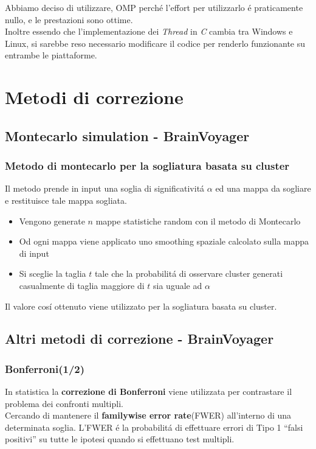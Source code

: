 \documentclass{beamer}
\begin{document}
\begin{frame}
Abbiamo deciso di utilizzare, OMP perch\'e l'effort per utilizzarlo \'e praticamente nullo, e le prestazioni sono ottime.\\
\medskip
Inoltre essendo che l'implementazione dei \textit{Thread} in \textit{C} cambia tra Windows e Linux, si sarebbe reso necessario modificare il codice per renderlo funzionante su entrambe le piattaforme.
\end{frame}

\section{Metodi di correzione}
\subsection{Montecarlo simulation - BrainVoyager}
\begin{frame}
\frametitle{Metodo di montecarlo per la sogliatura basata su cluster}
Il metodo prende in input una soglia di significativit\'a $\alpha$ ed una mappa da sogliare e restituisce tale mappa sogliata.
\begin{itemize}
\item Vengono generate $n$ mappe statistiche random con il metodo di Montecarlo
\item Od ogni mappa viene applicato uno smoothing spaziale calcolato sulla mappa di input
\item Si sceglie la taglia $t$ tale che la probabilit\'a  di osservare cluster generati casualmente di taglia maggiore di $t$ sia uguale ad $\alpha$
\end{itemize}
Il valore cos\'i ottenuto viene utilizzato per la sogliatura basata su cluster. 
\end{frame}

\subsection{Altri metodi di correzione - BrainVoyager}
\begin{frame}
\frametitle{Bonferroni(1/2)}
In statistica la \textbf{correzione di Bonferroni} viene utilizzata per contrastare il problema dei confronti multipli.\\
\medskip
Cercando di mantenere il \textbf{familywise error rate}(FWER) all'interno di una determinata soglia.
\medskip
L'FWER \'e la probabilit\'a di effettuare errori di Tipo 1 ``falsi positivi'' su tutte le ipotesi quando si effettuano test multipli.
\end{frame}
\end{document}
